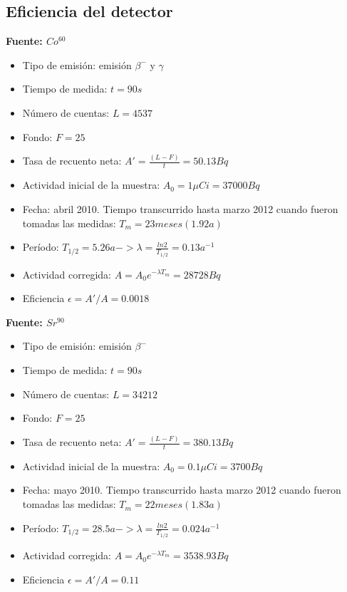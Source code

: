 \documentclass[11pt]{article}
\begin{document}
    

    \hypertarget{eficiencia-del-detector}{%
\subsection{Eficiencia del detector}\label{eficiencia-del-detector}}

    \textbf{Fuente: \(Co^{60}\)}

\begin{itemize}
\item
  Tipo de emisión: emisión \(\beta^{-}\) y \(\gamma\)
\item
  Tiempo de medida: \(t=90s\)
\item
  Número de cuentas: \(L=4537\)
\item
  Fondo: \(F = 25\)
\item
  Tasa de recuento neta: \(A'= \frac{(L-F)}{t} = 50.13 Bq\)
\item
  Actividad inicial de la muestra: \(A_0 = 1 \mu Ci = 37000 Bq\)
\item
  Fecha: abril 2010. Tiempo transcurrido hasta marzo 2012 cuando fueron
  tomadas las medidas: \(T_m = 23 meses (1.92 a)\)
\item
  Período:
  \(T_{1/2} = 5.26 a -> \lambda = \frac{ln2}{T_{1/2}} = 0.13 a^{-1}\)
\item
  Actividad corregida: \(A = A_0e^{- \lambda T_m} = 28728 Bq\)
\item
  Eficiencia \(\epsilon = A'/A = 0.0018\)
\end{itemize}

    \textbf{Fuente: \(Sr^{90}\)}

\begin{itemize}
\item
  Tipo de emisión: emisión \(\beta^{-}\)
\item
  Tiempo de medida: \(t=90s\)
\item
  Número de cuentas: \(L=34212\)
\item
  Fondo: \(F = 25\)
\item
  Tasa de recuento neta: \(A'= \frac{(L-F)}{t} = 380.13 Bq\)
\item
  Actividad inicial de la muestra: \(A_0 = 0.1 \mu Ci = 3700 Bq\)
\item
  Fecha: mayo 2010. Tiempo transcurrido hasta marzo 2012 cuando fueron
  tomadas las medidas: \(T_m = 22 meses (1.83 a)\)
\item
  Período:
  \(T_{1/2} = 28.5 a -> \lambda = \frac{ln2}{T_{1/2}} = 0.024 a^{-1}\)
\item
  Actividad corregida: \(A = A_0e^{- \lambda T_m} = 3538.93 Bq\)
\item
  Eficiencia \(\epsilon = A'/A = 0.11\)
\end{itemize}
\end{document}
